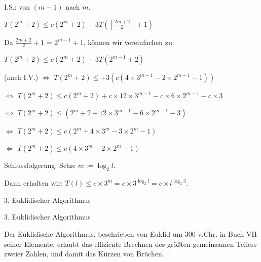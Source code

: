 \documentclass[10pt]{beamer}
\begin{document}
    
\begin{frame}

\noindent I.S.: von $(m-1)$ nach $m$.

$T( 2^m +2) \leq c (2^m +2) +3T(\left\lceil \frac{2m+2}{2} \right\rceil +1)$

\vspace{0.2cm}
Da $\frac{2m+2}{2}  +1$ = $2^{m-1}+1$, können wir vereinfachen zu: 

\vspace{0.15cm}
$T( 2^m +2) \leq c (2^m +2) +3T ( 2^{m-1} +2)$ 

\vspace{0.15cm}
(nach I.V.) $\Leftrightarrow $ $T( 2^m +2) \leq+3( c ( 4 \times 3^{m-1} -2 \times 2^{m-1} -1))$

\vspace{0.15cm}
$\Leftrightarrow$ $T(2^m +2) \leq c (2^m +2) + c \times 12 \times 3^{m-1} - c\times 6 \times 2^{m-1} - c \times 3 $

\vspace{0.15cm}
$\Leftrightarrow$  $T(2^m +2) \leq (2^m +2 +12 \times 3^{m-1} - 6 \times 2^{m-1} -3)$

\vspace{0.15cm}

$\Leftrightarrow$ $ T(2^m +2) \leq c( 2^m + 4 \times 3^m -3 \times 2^m -1)$

$\Leftrightarrow $ $T(2^m +2) \leq c (4 \times 3^m -2 \times 2^m -1) $


\vspace{0.4cm}
\noindent Schlussfolgerung: Setze $ m:= \log_2 l $.


\noindent Dann erhalten wir: $T(l) \leq c \times 3^m = c \times 3^{\log_2 l} = c \times l^{\log_2 3} $.

    
\end{frame}


\begin{frame}
\Large  %

3. Euklidischer Algorithmus
    
\end{frame}


\begin{frame}{3. Euklidischer Algorithmus}

Der Euklidische Algorithmus, beschrieben von Euklid um 300 v.Chr. in Buch VII seiner Elemente, erlaubt das effiziente Brechnen des größten gemeinsamen Teilers zweier Zahlen, und damit das Kürzen von Brüchen.
    
\end{frame}
\end{document}
